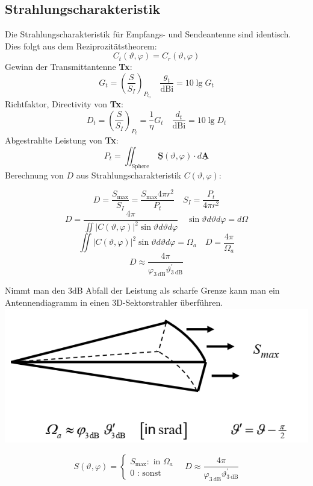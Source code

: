 \documentclass[english]{latex4ei/latex4ei_sheet}
\renewcommand{\vec}[1]{\underline{\boldsymbol{#1}}}
\begin{document}
\begin{sectionbox}
\subsection{Strahlungscharakteristik}
Die Strahlungscharakteristik für Empfangs- und Sendeantenne sind identisch. Dies folgt aus dem Reziprozitätstheorem:
$$
C_{t}(\vartheta, \varphi)=C_{r}(\vartheta, \varphi)
$$
Gewinn der Transmittantenne \textbf{Tx}: 
$$G_{t}=\left(\frac{S}{S_{I}}\right)_{P_{t_{0}}}
\quad 
\frac{g_{t}}{\mathrm{dBi}}=10 \lg G_{t}
$$
Richtfaktor, Directivity von \textbf{Tx}:
$$
D_{t}=\left(\frac{S}{S_{I}}\right)_{P_{t}}=\frac{1}{\eta} G_{t}
\quad 
\frac{d_{t}}{\mathrm{dBi}}=10 \lg D_{t}
$$
Abgestrahlte Leistung von \textbf{Tx}:
$$
P_{t}=\iint_{\text {Sphere }} \vec{S}(\vartheta, \varphi) \cdot d \vec{A}
$$
Berechnung von $D$ aus Strahlungscharakteristik $C( \vartheta , \varphi)$:
\begin{emphbox}
$$
D=\frac{S_{\max }}{S_{I}}=\frac{S_{\max } 4 \pi r^{2}}{P_{t}} \quad S_{I}=\frac{P_{t}}{4 \pi r^{2}}
$$
$$
D=\frac{4 \pi}{\iint|C(\vartheta, \varphi)|^{2} \sin \vartheta d \vartheta d \varphi} \quad \sin \vartheta d \vartheta d \varphi=d \Omega$$
$$ \iint|C(\vartheta, \varphi)|^{2} \sin \vartheta d \vartheta d \varphi=\Omega_{a}\quad
D=\frac{4 \pi}{\Omega_{a}}
$$
$$
D \approx \frac{4 \pi}{\varphi_{3 \mathrm{~dB}} \vartheta_{3 \mathrm{~dB}}^{\prime}}
$$
\end{emphbox}
\end{sectionbox}                         
\begin{sectionbox}
Nimmt man den $3$dB Abfall der Leistung als scharfe Grenze kann man ein Antennendiagramm in einen 3D-Sektorstrahler überführen.
	\includegraphics[width = \textwidth]{./img/antenne_3d_sektor.png}
	
\begin{emphbox}
$$
S(\vartheta, \varphi)=\left\{\begin{array}{c}
	S_{\max }: \text { in } \Omega_{a} \\
	0 \text { : sonst }
\end{array}\right. \quad
D \approx \frac{4 \pi}{\varphi_{3 \mathrm{~dB}} \vartheta_{3 \mathrm{~dB}}^{\prime}}
$$
\end{emphbox}
\end{sectionbox}
\end{document}
